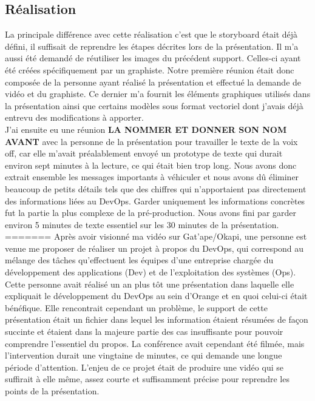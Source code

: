 \subsection{Réalisation}
La principale différence avec cette réalisation c'est que le storyboard était déjà défini, il suffisait de reprendre les étapes décrites lors de la présentation. Il m'a aussi été demandé de réutiliser les images du précédent support. Celles-ci ayant été créées spécifiquement par un graphiste. Notre première réunion était donc composée de la personne ayant réalisé la présentation et effectué la demande de vidéo et du graphiste. Ce dernier m'a fournit les éléments graphiques utilisés dans la présentation ainsi que certains modèles sous format vectoriel dont j'avais déjà entrevu des modifications à apporter.\\

J'ai ensuite eu une réunion \textbf{LA NOMMER ET DONNER SON NOM AVANT} avec la personne de la présentation pour travailler le texte de la voix off, car elle m'avait préalablement envoyé un prototype de texte qui durait environ sept minutes à la lecture, ce qui était bien trop long. Nous avons donc extrait ensemble les messages importants à véhiculer et nous avons dû éliminer beaucoup de petits détails tels que des chiffres qui n'apportaient pas directement des informations liées au DevOps. Garder uniquement les informations concrètes fut la partie la plus complexe de la pré-production. Nous avons fini par garder environ 5 minutes de texte essentiel sur les 30 minutes de la présentation.\\
=======
Après avoir visionné ma vidéo sur Gat'ape/Okapi, une personne est venue me proposer de réaliser un projet à propos du DevOps, qui correspond au mélange des tâches qu'effectuent les équipes d'une entreprise chargée du développement des applications (Dev) et de l'exploitation des systèmes (Ops). Cette personne avait réalisé un an plus tôt une présentation dans laquelle elle expliquait le développement du DevOps au sein d'Orange et en quoi celui-ci était bénéfique. Elle rencontrait cependant un problème, le support de cette présentation était un fichier dans lequel les information étaient résumées de façon succinte et étaient dans la majeure partie des cas insuffisante pour pouvoir comprendre l'essentiel du propos. La conférence avait cependant été filmée, mais l'intervention durait une vingtaine de minutes, ce qui demande une longue période d'attention. L'enjeu de ce projet était de produire une vidéo qui se suffirait à elle même, assez courte et suffisamment précise pour reprendre les points de la présentation.


